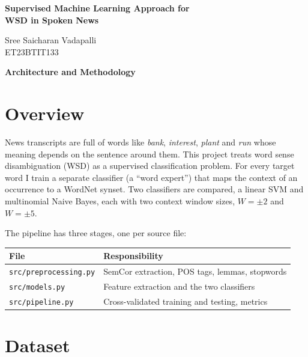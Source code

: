 \documentclass[11pt]{article}
\begin{document}
\begin{titlepage}
\centering
\vspace*{\fill}
{\LARGE\bfseries Supervised Machine Learning Approach for\\
WSD in Spoken News\par}
\vspace{3em}
{\large Sree Saicharan Vadapalli\\ ET23BTIT133\par}
\vspace*{\fill}
\end{titlepage}

\begin{center}
{\LARGE\bfseries Architecture and Methodology\par}
\end{center}
\vspace{1em}

\section{Overview}

News transcripts are full of words like \emph{bank}, \emph{interest},
\emph{plant} and \emph{run} whose meaning depends on the sentence around them.
This project treats word sense disambiguation (WSD) as a supervised
classification problem. For every target word I train a separate classifier
(a ``word expert'') that maps the context of an occurrence to a WordNet synset.
Two classifiers are compared, a linear SVM and multinomial Naive Bayes, each
with two context window sizes, $W = \pm 2$ and $W = \pm 5$.

The pipeline has three stages, one per source file:

\begin{center}
\begin{tabular}{ll}
\toprule
File & Responsibility \\
\midrule
\texttt{src/preprocessing.py} & SemCor extraction, POS tags, lemmas,
stopwords \\
\texttt{src/models.py} & Feature extraction and the two classifiers \\
\texttt{src/pipeline.py} & Cross-validated training and testing, metrics \\
\bottomrule
\end{tabular}
\end{center}

\section{Dataset}
\end{document}
